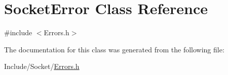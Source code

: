 \hypertarget{class_socket_error}{
\section{\-Socket\-Error \-Class \-Reference}
\label{class_socket_error}
}


{\ttfamily \#include $<$\-Errors.\-h$>$}



\-The documentation for this class was generated from the following file\-:\begin{DoxyCompactItemize}
\item 
\-Include/\-Socket/\hyperlink{_errors_8h}{\-Errors.\-h}\end{DoxyCompactItemize}
